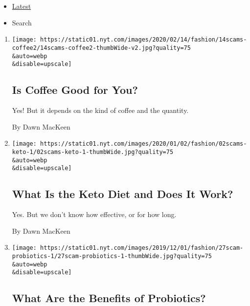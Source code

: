 \begin{itemize}
\tightlist
\item
  \protect\hyperlink{stream-panel}{Latest}
\item
  Search
\end{itemize}

\begin{enumerate}
\def\labelenumi{\arabic{enumi}.}
\item
  \href{/2020/02/13/style/self-care/coffee-benefits.html}{}

  \texttt{[image: https://static01.nyt.com/images/2020/02/14/fashion/14scams-coffee2/14scams-coffee2-thumbWide-v2.jpg?quality=75\\\&auto=webp\\\&disable=upscale]}

  \hypertarget{is-coffee-good-for-you}{%
  \subsection{Is Coffee Good for You?}\label{is-coffee-good-for-you}}

  Yes! But it depends on the kind of coffee and the quantity.

  By Dawn MacKeen
\item
  \href{/2020/01/02/style/self-care/keto-diet-explained-benefits.html}{}

  \texttt{[image: https://static01.nyt.com/images/2020/01/02/fashion/02scams-keto-1/02scams-keto-1-thumbWide.jpg?quality=75\\\&auto=webp\\\&disable=upscale]}

  \hypertarget{what-is-the-keto-diet-and-does-it-work}{%
  \subsection{What Is the Keto Diet and Does It
  Work?}\label{what-is-the-keto-diet-and-does-it-work}}

  Yes. But we don't know how effective, or for how long.

  By Dawn MacKeen
\item
  \href{/2019/11/27/style/self-care/probiotics-benefits.html}{}

  \texttt{[image: https://static01.nyt.com/images/2019/12/01/fashion/27scam-probiotics-1/27scam-probiotics-1-thumbWide.jpg?quality=75\\\&auto=webp\\\&disable=upscale]}

  \hypertarget{what-are-the-benefits-of-probiotics}{%
  \subsection{What Are the Benefits of
  Probiotics?}\label{what-are-the-benefits-of-probiotics}}


\end{enumerate}
